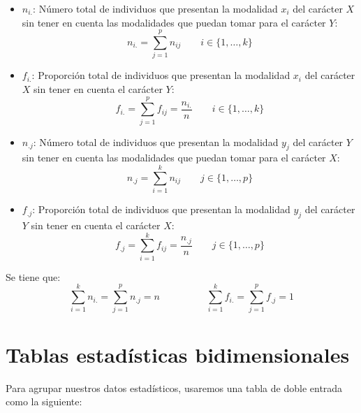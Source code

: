 \begin{itemize}
    \item $n_{i.}$: Número total de individuos que presentan la modalidad $x_i$ del carácter $X$ sin tener en cuenta
          las modalidades que puedan tomar para el carácter $Y$:
          $$n_{i.} = \sum_{j=1}^p n_{ij} \qquad i\in \{1, \ldots, k\}$$
    \item $f_{i.}$: Proporción total de individuos que presentan la modalidad $x_i$ del carácter $X$ sin tener
          en cuenta el carácter $Y$:
          $$f_{i.} = \sum_{j=1}^p f_{ij} = \dfrac{n_{i.}}{n} \qquad i \in \{1, \ldots, k\}$$
    \item $n_{.j}$: Número total de individuos que presentan la modalidad $y_j$ del carácter $Y$ sin tener en cuenta
          las modalidades que puedan tomar para el carácter $X$:
          $$n_{.j} = \sum_{i=1}^k n_{ij} \qquad j\in \{1, \ldots, p\}$$
    \item $f_{.j}$: Proporción total de individuos que presentan la modalidad $y_j$ del carácter $Y$ sin tener
          en cuenta el carácter $X$:
          $$f_{.j} = \sum_{i=1}^k f_{ij} = \dfrac{n_{.j}}{n} \qquad j \in \{1, \ldots, p\}$$
\end{itemize}

Se tiene que:
$$\sum_{i=1}^k n_{i.} = \sum_{j=1}^p n_{.j} = n \hspace{2cm} \sum_{i=1}^k f_{i.} = \sum_{j=1}^p f_{.j} = 1$$

\section{Tablas estadísticas bidimensionales}

Para agrupar nuestros datos estadísticos, usaremos una tabla de doble entrada como la siguiente:

